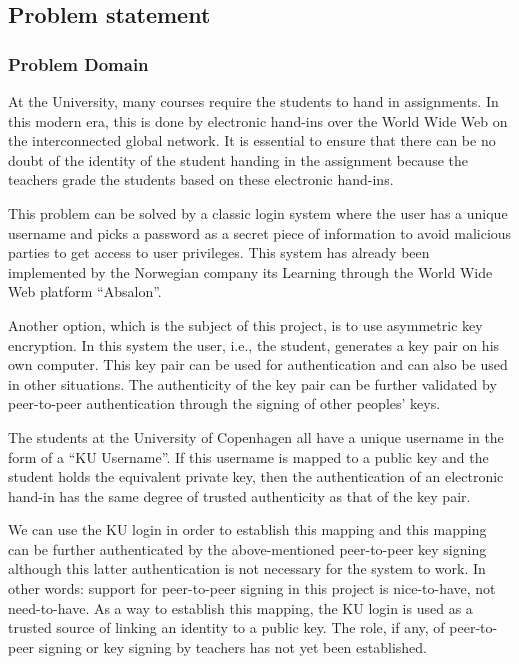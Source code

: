 \documentclass[11pt,a4paper]{report}
\begin{document}
\subsection{Problem statement}
\subsubsection{Problem Domain}
At the University, many courses require the students to hand in assignments. In this modern era, this is done by electronic hand-ins over the World Wide Web on the interconnected global network. It is essential to ensure that there can be no doubt of the identity of the student handing in the assignment because the teachers grade the students based on these electronic hand-ins.

This problem can be solved by a classic login system where the user has a unique username and picks a password as a secret piece of information to avoid malicious parties to get access to user privileges. This system has already been implemented by the Norwegian company its Learning through the World Wide Web platform ``Absalon''.

Another option, which is the subject of this project, is to use asymmetric key encryption. In this system the user, i.e., the student, generates a key pair on his own computer. This key pair can be used for authentication and can also be used in other situations. The authenticity of the key pair can be further validated by peer-to-peer authentication through the signing of other peoples' keys.

The students at the University of Copenhagen all have a unique username in the form of a ``KU Username''. If this username is mapped to a public key and the student holds the equivalent private key, then the authentication of an electronic hand-in has the same degree of trusted authenticity as that of the key pair.

We can use the KU login in order to establish this mapping and this mapping can be further authenticated by the above-mentioned peer-to-peer key signing although this latter authentication is not necessary for the system to work. In other words: support for peer-to-peer signing in this project is nice-to-have, not need-to-have. As a way to establish this mapping, the KU login is used as a trusted source of linking an identity to a public key. The role, if any, of peer-to-peer signing or key signing by teachers has not yet been established.
\end{document}
